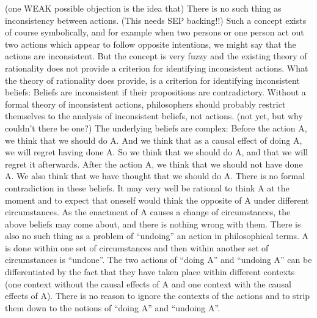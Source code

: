 (one WEAK possible objection is the idea that) There is no such thing as inconsistency between actions. (This needs SEP backing!!) Such a concept exists of course symbolically, and for example when two persons or one person act out two actions which appear to follow opposite intentions, we might say that the actions are inconsistent. But the concept is very fuzzy and the existing theory of rationality does not provide a criterion for identifying inconsistent actions. What the theory of rationality does provide, is a criterion for identifying inconsistent beliefs: Beliefs are inconsistent if their propositions are contradictory. Without a formal theory of inconsistent actions, philosophers should probably restrict themselves to the analysis of inconsistent beliefs, not actions. (not yet, but why couldn’t there be one?) The underlying beliefs are complex: Before the action A, we think that we should do A. And we think that as a causal effect of doing A, we will regret having done A. So we think that we should do A, and that we will regret it afterwards. After the action A, we think that we should not have done A. We also think that we have thought that we should do A. There is no formal contradiction in these beliefs. It may very well be rational to think A at the moment and to expect that oneself would think the opposite of A under different circumstances. As the enactment of A causes a change of circumstances, the above beliefs may come about, and there is nothing wrong with them. There is also no such thing as a problem of “undoing” an action in philosophical terms. A is done within one set of circumstances and then within another set of circumstances is “undone”. The two actions of “doing A” and “undoing A” can be differentiated by the fact that they have taken place within different contexts (one context without the causal effects of A and one context with the causal effects of A). There is no reason to ignore the contexts of the actions and to strip them down to the notions of “doing A” and “undoing A”.  

